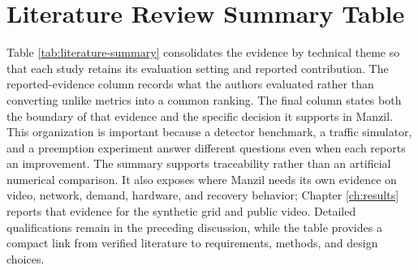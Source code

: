 \section{Literature Review Summary Table}

Table \ref{tab:literature-summary} consolidates the evidence by technical theme so that each study retains its evaluation setting and reported contribution. The reported-evidence column records what the authors evaluated rather than converting unlike metrics into a common ranking. The final column states both the boundary of that evidence and the specific decision it supports in Manzil. This organization is important because a detector benchmark, a traffic simulator, and a preemption experiment answer different questions even when each reports an improvement. The summary supports traceability rather than an artificial numerical comparison. It also exposes where Manzil needs its own evidence on video, network, demand, hardware, and recovery behavior; Chapter \ref{ch:results} reports that evidence for the synthetic grid and public video. Detailed qualifications remain in the preceding discussion, while the table provides a compact link from verified literature to requirements, methods, and design choices.

